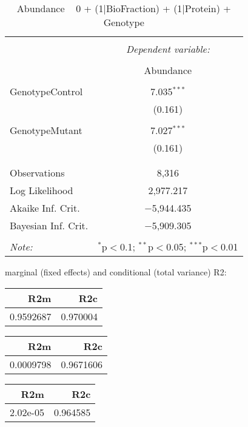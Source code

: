 \documentclass[11pt]{report}
\begin{document}
\begin{table}[!htbp] \centering 
  \caption{Abundance ~ 0 + (1|BioFraction) + (1|Protein) + Genotype} 
  \label{} 
\begin{tabular}{@{\extracolsep{5pt}}lc} 
\\[-1.8ex]\hline 
\hline \\[-1.8ex] 
 & \multicolumn{1}{c}{\textit{Dependent variable:}} \\ 
\cline{2-2} 
\\[-1.8ex] & Abundance \\ 
\hline \\[-1.8ex] 
 GenotypeControl & 7.035$^{***}$ \\ 
  & (0.161) \\ 
  & \\ 
 GenotypeMutant & 7.027$^{***}$ \\ 
  & (0.161) \\ 
  & \\ 
\hline \\[-1.8ex] 
Observations & 8,316 \\ 
Log Likelihood & 2,977.217 \\ 
Akaike Inf. Crit. & $-$5,944.435 \\ 
Bayesian Inf. Crit. & $-$5,909.305 \\ 
\hline 
\hline \\[-1.8ex] 
\textit{Note:}  & \multicolumn{1}{r}{$^{*}$p$<$0.1; $^{**}$p$<$0.05; $^{***}$p$<$0.01} \\ 
\end{tabular} 
\end{table} 
marginal (fixed effects) and conditional (total variance) R2:

\begin{tabular}{r|r}
\hline
R2m & R2c\\
\hline
0.9592687 & 0.970004\\
\hline
\end{tabular}

\begin{tabular}{r|r}
\hline
R2m & R2c\\
\hline
0.0009798 & 0.9671606\\
\hline
\end{tabular}

\begin{tabular}{r|r}
\hline
R2m & R2c\\
\hline
2.02e-05 & 0.964585\\
\hline
\end{tabular}
\end{document}

